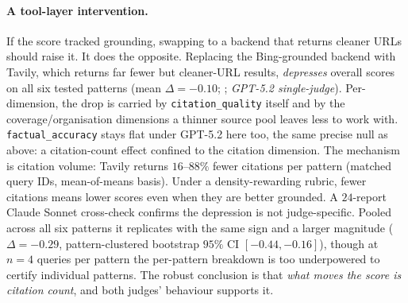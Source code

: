 \documentclass[11pt]{article}
\newcommand{\dimrow}[1]{\texttt{#1}}
\begin{document}
\paragraph{A tool-layer intervention.} If the score
tracked grounding, swapping to a backend that returns cleaner URLs should raise it.
It does the opposite. Replacing the Bing-grounded backend with Tavily, which returns
far fewer but cleaner-URL results, \emph{depresses} overall scores on all six tested
patterns (mean $\Delta=-0.10$; ; \emph{GPT-5.2 single-judge}). Per-dimension,
the drop is carried by \dimrow{citation\_quality} itself and by the coverage/organisation
dimensions a thinner source pool leaves less to work with. \dimrow{factual\_accuracy} stays
flat under GPT-5.2 here too, the same precise null as above: a citation-count
effect confined to the citation dimension. The
mechanism is citation volume: Tavily returns $16$--$88\%$ fewer citations per pattern
(matched query IDs, mean-of-means basis). Under a
density-rewarding rubric, fewer citations means lower scores even when they are better
grounded. A $24$-report Claude Sonnet cross-check confirms the depression is not
judge-specific. Pooled across all six patterns it replicates with the same sign and a
larger magnitude ($\Delta=-0.29$, pattern-clustered bootstrap $95\%$ CI $[-0.44,-0.16]$),
though at $n{=}4$ queries per pattern the per-pattern breakdown is too underpowered to
certify individual patterns. The robust conclusion is that
\emph{what moves the score is citation count}, and both judges'
behaviour supports it.
\end{document}
